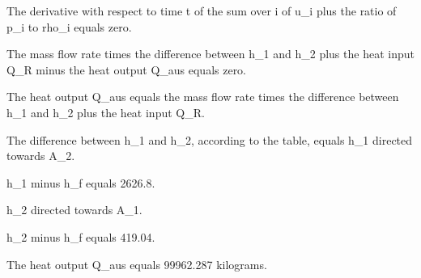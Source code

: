 The derivative with respect to time t of the sum over i of u_i plus the ratio of p_i to rho_i equals zero.

The mass flow rate times the difference between h_1 and h_2 plus the heat input Q_R minus the heat output Q_aus equals zero.

The heat output Q_aus equals the mass flow rate times the difference between h_1 and h_2 plus the heat input Q_R.

The difference between h_1 and h_2, according to the table, equals h_1 directed towards A_2.

h_1 minus h_f equals 2626.8.

h_2 directed towards A_1.

h_2 minus h_f equals 419.04.

The heat output Q_aus equals 99962.287 kilograms.
